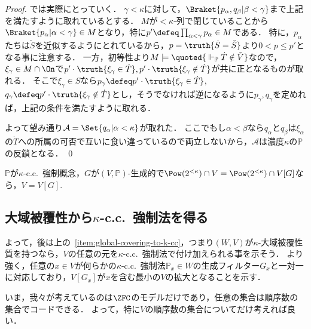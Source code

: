 \documentclass[a4j,leqno]{ltjsarticle}
\newcommand{\cc}{c.c.\ }
\begin{document}
\begin{proof}
 では実際にとっていく．
 $\gamma < \kappa$に対して，$\Braket{p_\alpha, q_\beta | \beta < \gamma}$まで上記を満たすように取れているとする．
 $M$が${<}\kappa$-列で閉じていることから$\Braket{p_\alpha | \alpha < \gamma } \in M$となり，特に$p' \defeq \prod_{\alpha < \gamma} p_\alpha \in M$である．
 特に，$p_\alpha$たちは$\check{S}$を近似するようにとれているから，$p = \truth{\dot{S} = \check{S}}$より$0 < p \leq p'$となる事に注意する．
 一方，初等性より$M \models \quoted{{} \Vdash_{\mathbb{P}} \dot{T} \notin \check{V}}$なので，$\xi_\gamma \in M \cap \On$で$p' \cdot \truth{\xi_\gamma \in \dot{T}}, p' \cdot \truth{\xi_\gamma \notin \dot{T}}$が共に正となるものが取れる．
 そこで$\xi_\gamma \in S$なら$p_\gamma \defeq p' \cdot \truth{\xi_\gamma \in \dot{T}}$, $q_\gamma \defeq p' \cdot \truth{\xi_\gamma \notin \dot{T}}$とし，そうでなければ逆になるように$p_\gamma, q_\gamma$を定めれば，上記の条件を満たすように取れる．

 よって望み通り$\mathcal{A} = \Set{q_\alpha | \alpha < \kappa}$が取れた．
 ここでもし$\alpha < \beta$なら$q_\alpha$と$q_\beta$は$\xi_\alpha$の$\dot{T}$への所属の可否で互いに食い違っているので両立しないから，$\mathcal{A}$は濃度$\kappa$の$\mathbb{P}$の反鎖となる． \qed
\end{proof}

\begin{corollary}\label{cor:2<kappa-cc-tirival}
 $\mathbb{P}$が$\kappa$-\cc{}強制概念，$G$が$(V, \mathbb{P})$-生成的で$\Pow(2^{<\kappa}) \cap V = \Pow(2^{<\kappa}) \cap V[G]$なら，$V = V[G]$.
\end{corollary}

\subsection{大域被覆性から$\kappa$-\cc{}強制法を得る}
よって，後は上の~\ref{item:global-covering-to-k-cc}，つまり$(W, V)$が$\kappa$-大域被覆性質を持つなら，$V$の任意の元を$\kappa$-\cc{}強制法で付け加えられる事を示そう．
より強く，任意の$x \in V$が何らかの$\kappa$-\cc{}強制法$\mathbb{P}_x \in W$の生成フィルター$G_x$と一対一に対応しており，$V[G_x]$が$x$を含む最小の$V$の拡大となることを示す．

いま，我々が考えているのは$\ZFC$のモデルだけであり，任意の集合は順序数の集合でコードできる．
よって，特に$V$の順序数の集合についてだけ考えれば良い．
\end{document}
